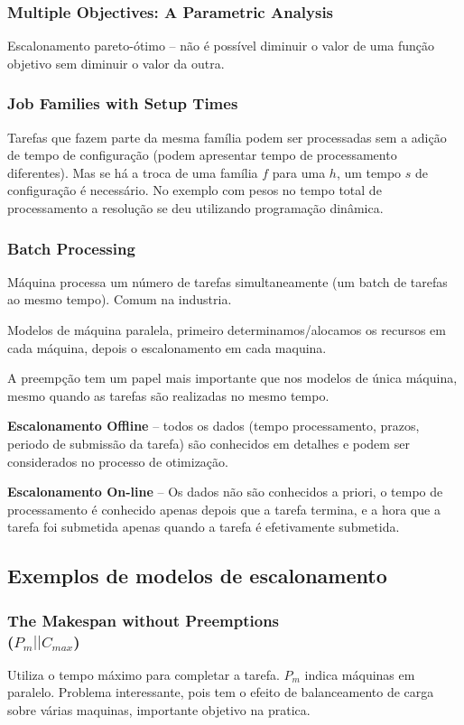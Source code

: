 \subsubsection{Multiple Objectives: A Parametric Analysis}
Escalonamento pareto-ótimo – não é possível diminuir o valor de uma função objetivo sem diminuir o valor da outra.
\\
\subsubsection{Job Families with Setup Times}
Tarefas que fazem parte da mesma família podem ser processadas sem a adição de tempo de configuração (podem apresentar tempo de processamento diferentes). Mas se há a troca de uma família $f$ para uma $h$, um tempo $s$ de configuração é necessário. No exemplo com pesos no tempo total de processamento a resolução se deu utilizando programação dinâmica.
\\
\subsubsection{Batch Processing}
Máquina processa um número de tarefas simultaneamente (um batch de tarefas ao mesmo tempo). Comum na industria. 

Modelos de máquina paralela, primeiro determinamos/alocamos os recursos em cada máquina, depois o escalonamento em cada maquina.

A preempção tem um papel mais importante que nos modelos de única máquina, mesmo quando as tarefas são realizadas no mesmo tempo. 

\textbf{Escalonamento Offline} – todos os dados (tempo processamento, prazos, periodo de submissão da tarefa) são conhecidos em detalhes e podem ser considerados no processo de otimização.

\textbf{Escalonamento On-line} – Os dados não são conhecidos a priori, o tempo de processamento é conhecido apenas depois que a tarefa termina, e a hora que a tarefa foi submetida apenas quando a tarefa é efetivamente submetida. \\


\subsection{Exemplos de modelos de escalonamento}
\subsubsection{The Makespan without Preemptions  \\($P_m || C_{max}$)}
	Utiliza o tempo máximo para completar a tarefa. $P_m$ indica máquinas em paralelo. Problema interessante, pois tem o efeito de balanceamento de carga sobre várias maquinas, importante objetivo na pratica.

